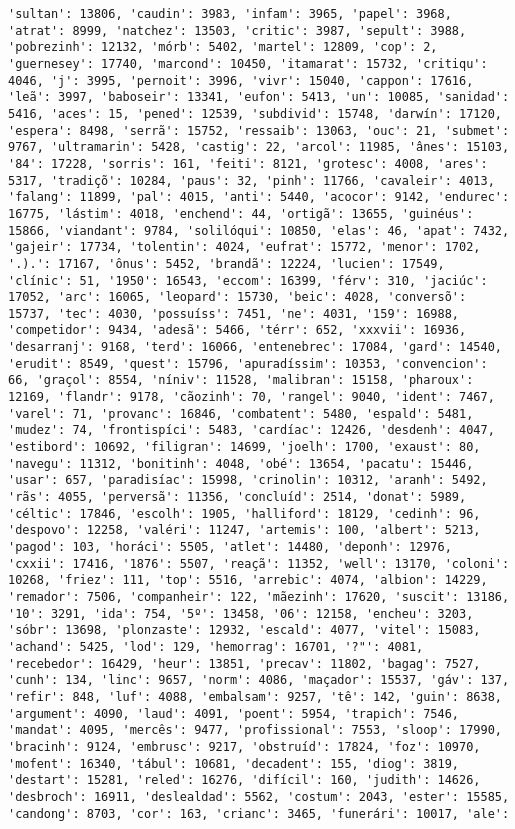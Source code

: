 \documentclass[11pt]{article}
\begin{document}
\begin{Verbatim}[commandchars=\\\{\}]
'sultan': 13806, 'caudin': 3983, 'infam': 3965, 'papel': 3968, 'atrat': 8999, 'natchez': 13503, 'critic': 3987, 'sepult': 3988, 'pobrezinh': 12132, 'mórb': 5402, 'martel': 12809, 'cop': 2, 'guernesey': 17740, 'marcond': 10450, 'itamarat': 15732, 'critiqu': 4046, 'j': 3995, 'pernoit': 3996, 'vivr': 15040, 'cappon': 17616, 'leã': 3997, 'baboseir': 13341, 'eufon': 5413, 'un': 10085, 'sanidad': 5416, 'aces': 15, 'pened': 12539, 'subdivid': 15748, 'darwín': 17120, 'espera': 8498, 'serrã': 15752, 'ressaib': 13063, 'ouc': 21, 'submet': 9767, 'ultramarin': 5428, 'castig': 22, 'arcol': 11985, 'ânes': 15103, '84': 17228, 'sorris': 161, 'feiti': 8121, 'grotesc': 4008, 'ares': 5317, 'tradiçõ': 10284, 'paus': 32, 'pinh': 11766, 'cavaleir': 4013, 'falang': 11899, 'pal': 4015, 'anti': 5440, 'acocor': 9142, 'endurec': 16775, 'lástim': 4018, 'enchend': 44, 'ortigã': 13655, 'guinéus': 15866, 'viandant': 9784, 'solilóqui': 10850, 'elas': 46, 'apat': 7432, 'gajeir': 17734, 'tolentin': 4024, 'eufrat': 15772, 'menor': 1702, '.).': 17167, 'ônus': 5452, 'brandã': 12224, 'lucien': 17549, 'clínic': 51, '1950': 16543, 'eccom': 16399, 'férv': 310, 'jaciúc': 17052, 'arc': 16065, 'leopard': 15730, 'beic': 4028, 'conversõ': 15737, 'tec': 4030, 'possuíss': 7451, 'ne': 4031, '159': 16988, 'competidor': 9434, 'adesã': 5466, 'térr': 652, 'xxxvii': 16936, 'desarranj': 9168, 'terd': 16066, 'entenebrec': 17084, 'gard': 14540, 'erudit': 8549, 'quest': 15796, 'apuradíssim': 10353, 'convencion': 66, 'graçol': 8554, 'níniv': 11528, 'malibran': 15158, 'pharoux': 12169, 'flandr': 9178, 'cãozinh': 70, 'rangel': 9040, 'ident': 7467, 'varel': 71, 'provanc': 16846, 'combatent': 5480, 'espald': 5481, 'mudez': 74, 'frontispíci': 5483, 'cardíac': 12426, 'desdenh': 4047, 'estibord': 10692, 'filigran': 14699, 'joelh': 1700, 'exaust': 80, 'navegu': 11312, 'bonitinh': 4048, 'obé': 13654, 'pacatu': 15446, 'usar': 657, 'paradisíac': 15998, 'crinolin': 10312, 'aranh': 5492, 'rãs': 4055, 'perversã': 11356, 'concluíd': 2514, 'donat': 5989, 'céltic': 17846, 'escolh': 1905, 'halliford': 18129, 'cedinh': 96, 'despovo': 12258, 'valéri': 11247, 'artemis': 100, 'albert': 5213, 'pagod': 103, 'horáci': 5505, 'atlet': 14480, 'deponh': 12976, 'cxxii': 17416, '1876': 5507, 'reaçã': 11352, 'well': 13170, 'coloni': 10268, 'friez': 111, 'top': 5516, 'arrebic': 4074, 'albion': 14229, 'remador': 7506, 'companheir': 122, 'mãezinh': 17620, 'suscit': 13186, '10': 3291, 'ida': 754, '5º': 13458, '06': 12158, 'encheu': 3203, 'sóbr': 13698, 'plonzaste': 12932, 'escald': 4077, 'vitel': 15083, 'achand': 5425, 'lod': 129, 'hemorrag': 16701, '?"': 4081, 'recebedor': 16429, 'heur': 13851, 'precav': 11802, 'bagag': 7527, 'cunh': 134, 'linc': 9657, 'norm': 4086, 'maçador': 15537, 'gáv': 137, 'refir': 848, 'luf': 4088, 'embalsam': 9257, 'tê': 142, 'guin': 8638, 'argument': 4090, 'laud': 4091, 'poent': 5954, 'trapich': 7546, 'mandat': 4095, 'mercês': 9477, 'profissional': 7553, 'sloop': 17990, 'bracinh': 9124, 'embrusc': 9217, 'obstruíd': 17824, 'foz': 10970, 'mofent': 16340, 'tábul': 10681, 'decadent': 155, 'diog': 3819, 'destart': 15281, 'reled': 16276, 'difícil': 160, 'judith': 14626, 'desbroch': 16911, 'deslealdad': 5562, 'costum': 2043, 'ester': 15585, 'candong': 8703, 'cor': 163, 'crianc': 3465, 'funerári': 10017, 'ale': 
\end{Verbatim}
\end{document}
